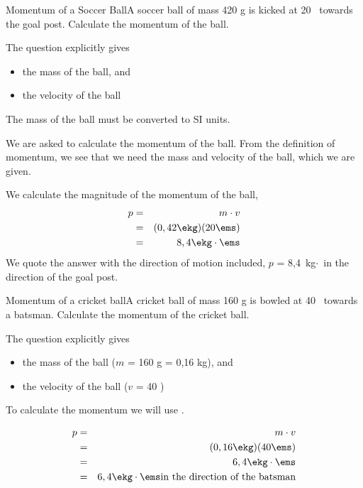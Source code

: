 \begin{wex}{Momentum of a Soccer Ball}{A soccer ball of mass 420 g is kicked at 20 \ms\ towards the goal post. Calculate the momentum of the ball.}{
The question explicitly gives
\begin{itemize}
\item the mass of the ball, and
\item the velocity of the ball
\end{itemize}
The mass of the ball must be converted to SI units.


We are asked to calculate the momentum of the ball. From the definition of momentum,
we see that we need the mass and velocity of the ball, which we are given.

We calculate the magnitude of the momentum of the ball,
\begin{eqnarray*}
p&=& m \cdot v \\
&=& (0,42 \ekg)(20 \ems)\\
&=& 8,4\ekg \cdot \ems
\end{eqnarray*}
We quote the answer with the direction of motion included,
$p$ = 8,4~kg$\cdot$\ms\ in the direction of the goal post.}
\end{wex}

\begin{wex}{Momentum of a cricket ball}{A cricket ball of mass 160 g is bowled at 40 \ms\ towards a batsman. Calculate the momentum of the cricket ball.}{
The question explicitly gives
\begin{itemize}
\item the mass of the ball ($m$ = 160 g = 0,16 kg), and
\item the velocity of the ball ($v$ = 40 \ms)
\end{itemize}
To calculate the momentum we will use .

\begin{eqnarray*}
p&=& m \cdot v \\
&=& (0,16 \ekg)(40 \ems)\\
&=& 6,4\ekg \cdot \ems \\
&=& 6,4\ekg \cdot \ems \mbox{in the direction of the batsman}
\end{eqnarray*}
}
\end{wex}

